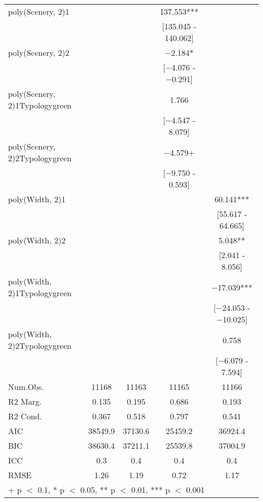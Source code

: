 \begin{table}
\begin{tabular}[t]{lcccc}
poly(Scenery, 2)1 &  &  & \num{137.553}*** & \\
 &  &  & {}[\num{135.045} - \num{140.062}] & \\
poly(Scenery, 2)2 &  &  & \num{-2.184}* & \\
 &  &  & {}[\num{-4.076} - \num{-0.291}] & \\
poly(Scenery, 2)1Typologygreen &  &  & \num{1.766} & \\
 &  &  & {}[\num{-4.547} - \num{8.079}] & \\
poly(Scenery, 2)2Typologygreen &  &  & \num{-4.579}+ & \\
 &  &  & {}[\num{-9.750} - \num{0.593}] & \\
poly(Width, 2)1 &  &  &  & \num{60.141}***\\
 &  &  &  & {}[\num{55.617} - \num{64.665}]\\
poly(Width, 2)2 &  &  &  & \num{5.048}**\\
 &  &  &  & {}[\num{2.041} - \num{8.056}]\\
poly(Width, 2)1Typologygreen &  &  &  & \num{-17.039}***\\
 &  &  &  & {}[\num{-24.053} - \num{-10.025}]\\
poly(Width, 2)2Typologygreen &  &  &  & \num{0.758}\\
 &  &  &  & {}[\num{-6.079} - \num{7.594}]\\
\midrule
Num.Obs. & \num{11168} & \num{11163} & \num{11165} & \num{11166}\\
R2 Marg. & \num{0.135} & \num{0.195} & \num{0.686} & \num{0.193}\\
R2 Cond. & \num{0.367} & \num{0.518} & \num{0.797} & \num{0.541}\\
AIC & \num{38549.9} & \num{37130.6} & \num{25459.2} & \num{36924.4}\\
BIC & \num{38630.4} & \num{37211.1} & \num{25539.8} & \num{37004.9}\\
ICC & \num{0.3} & \num{0.4} & \num{0.4} & \num{0.4}\\
RMSE & \num{1.26} & \num{1.19} & \num{0.72} & \num{1.17}\\
\bottomrule
\multicolumn{5}{l}{\rule{0pt}{1em}+ p $<$ 0.1, * p $<$ 0.05, ** p $<$ 0.01, *** p $<$ 0.001}\\
\end{tabular}
\end{table}
